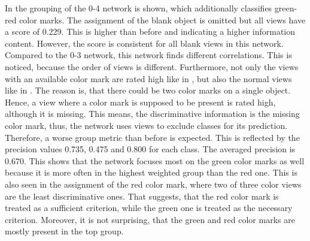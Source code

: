 In  the grouping of the 0-4 network is shown, which additionally classifies green-red color marks.
The assignment of the blank object is omitted but all views have a score of 0.229.
This is higher than before and indicating a higher information content.
However, the score is consistent for all blank views in this network.
Compared to the 0-3 network, this network finds different correlations.
This is noticed, because the order of views is different.
Furthermore, not only the views with an available color mark are rated high like in , but also the normal views like in .
The reason is, that there could be two color marks on a single object.
Hence, a view where a color mark is supposed to be present is rated high, although it is missing.
This means, the discriminative information is the missing color mark, thus, the network uses views to exclude classes for its prediction.
Therefore, a worse group metric than before is expected.
This is reflected by the precision values 0.735, 0.475 and 0.800 for each class.
The averaged precision is 0.670.
This shows that the network focuses most on the green color marks as well because it is more often in the highest weighted group than the red one.
This is also seen in the assignment of the red color mark, where two of three color views are the least discriminative ones.
That suggests, that the red color mark is treated as a sufficient criterion, while the green one is treated as the necessary criterion.
Moreover, it is not surprising, that the green and red color marks are mostly present in the top group.
